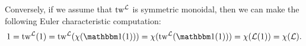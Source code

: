 
Conversely, if we assume that $\mathrm{tw}^{\mathcal{L}}$ is symmetric monoidal, then we can make the following Euler characteristic computation:
\[ 1 = \twist^{\mathcal{L}} (1) = \twist^{\mathcal{L}}( \chi (\o(1))) = \chi ( \twist^{\mathcal{L}}(\o(1))) = \chi ( \mathcal{L}(1) ) = \chi (\mathcal{L}). \]




